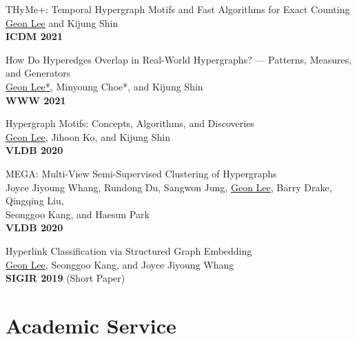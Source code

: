 \documentclass[11pt, letterpaper]{article}
\newcommand{\awardnote}[1]{\enspace{\small\itshape\color{AWARD}#1}}
\begin{document}
{{\begin{enumerate}[
  label={\textcolor{ACCENT}{[\arabic*]}},
  leftmargin=1.8em,
  itemsep=0.7em   %
]
\item THyMe+: Temporal Hypergraph Motifs and Fast Algorithms for Exact Counting\\
\underline{Geon Lee} and Kijung Shin\\
\textbf{ICDM 2021}\awardnote{Best-Ranked Paper}

\item How Do Hyperedges Overlap in Real-World Hypergraphs? --- Patterns, Measures, and Generators\\
\underline{Geon Lee*}, Minyoung Choe*, and Kijung Shin\\
\textbf{WWW 2021}

\item Hypergraph Motifs: Concepts, Algorithms, and Discoveries\\
\underline{Geon Lee}, Jihoon Ko, and Kijung Shin\\
\textbf{VLDB 2020}

\item MEGA: Multi-View Semi-Supervised Clustering of Hypergraphs\\
Joyce Jiyoung Whang, Rundong Du, Sangwon Jung, \underline{Geon Lee}, Barry Drake, Qingqing Liu, \\Seonggoo Kang, and Haesun Park\\
\textbf{VLDB 2020}


\item Hyperlink Classification via Structured Graph Embedding\\
\underline{Geon Lee}, Seonggoo Kang, and Joyce Jiyoung Whang\\
\textbf{SIGIR 2019} (Short Paper)

\end{enumerate}
}

\normalsize

\vspace{15pt}
\section*{Academic Service}

}
\end{document}
